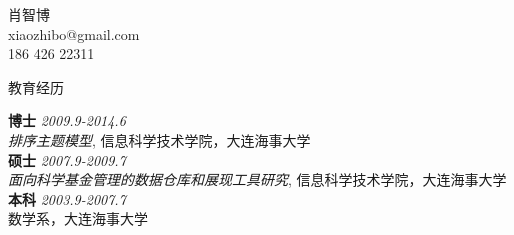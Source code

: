 \documentclass[9pt]{article}
\newenvironment{changemargin}[2]{%
  \begin{list}{}{%
    \setlength{\topsep}{0pt}%
    \setlength{\leftmargin}{#1}%
    \setlength{\rightmargin}{#2}%
    \setlength{\listparindent}{\parindent}%
    \setlength{\itemindent}{\parindent}%
    \setlength{\parsep}{\parskip}%
  }%
  \item[]}{\end{list}
}
\newcommand{\lineover}{
	\begin{changemargin}{-0.05in}{-0.05in}
		\vspace*{-8pt}
		\hrulefill \\
		\vspace*{-2pt}
	\end{changemargin}
}
\newcommand{\header}[1]{
	\begin{changemargin}{-0.5in}{-0.5in}
		\scshape{#1}\\
  	\lineover
	\end{changemargin}
}
\newcommand{\contact}[4]{
	\begin{changemargin}{-0.5in}{-0.5in}
		\begin{center}
			{\Large \scshape {#1}}\\ \smallskip
			{#2}\\ \smallskip
			{#3}\\ \smallskip
			{#4}\smallskip
		\end{center}
	\end{changemargin}
}
\newenvironment{body} {
	\vspace*{-16pt}
	\begin{changemargin}{-0.25in}{-0.5in}
  }
	{\end{changemargin}
}
\begin{document}
\contact{肖智博}{xiaozhibo@gmail.com}{186 426 22311}






\header{\Large{教育经历}}

\begin{body}
   \vspace{14pt}
	\textbf{博士}{} \hfill \emph{2009.9-2014.6}{} \\
	\emph{排序主题模型}, 信息科学技术学院，大连海事大学{} \\
  \medskip
	\textbf{硕士}{} \hfill \emph{2007.9-2009.7}{} \\
	\emph{面向科学基金管理的数据仓库和展现工具研究}, 信息科学技术学院，大连海事大学{} \\
  \medskip
	\textbf{本科} \hfill \emph{2003.9-2007.7} \\
	数学系，大连海事大学\\
\end{body}
\end{document}
